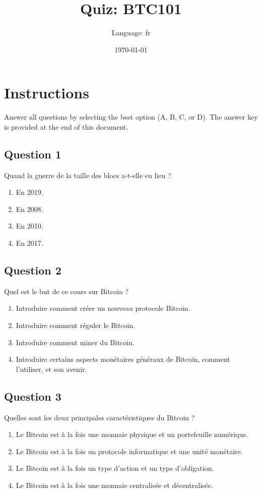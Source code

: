 \documentclass[12pt,a4paper]{article}
\title{Quiz: BTC101}
\author{Language: fr}
\date{\today}
\begin{document}
\maketitle
\thispagestyle{fancy}

\section*{Instructions}
Answer all questions by selecting the best option (A, B, C, or D). The answer key is provided at the end of this document.

\bigskip


\subsection*{Question 1}
Quand la guerre de la taille des blocs a-t-elle eu lieu ?

\begin{enumerate}[label=\Alph*., leftmargin=*]
\item En 2019.
\item En 2008.
\item En 2010.
\item En 2017.
\end{enumerate}

\bigskip


\subsection*{Question 2}
Quel est le but de ce cours sur Bitcoin ?

\begin{enumerate}[label=\Alph*., leftmargin=*]
\item Introduire comment créer un nouveau protocole Bitcoin.
\item Introduire comment réguler le Bitcoin.
\item Introduire comment miner du Bitcoin.
\item Introduire certains aspects monétaires généraux de Bitcoin, comment l'utiliser, et son avenir.
\end{enumerate}

\bigskip


\subsection*{Question 3}
Quelles sont les deux principales caractéristiques du Bitcoin ?

\begin{enumerate}[label=\Alph*., leftmargin=*]
\item Le Bitcoin est à la fois une monnaie physique et un portefeuille numérique.
\item Le Bitcoin est à la fois un protocole informatique et une unité monétaire.
\item Le Bitcoin est à la fois un type d'action et un type d'obligation.
\item Le Bitcoin est à la fois une monnaie centralisée et décentralisée.
\end{enumerate}
\end{document}
